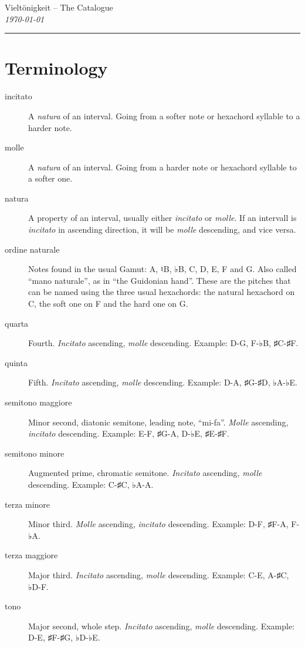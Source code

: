 \documentclass[a4paper,DIV=17,11pt,headings=standardclasses]{scrartcl}
\begin{document}
\hspace{1cm}
\vspace{2cm}

\thispagestyle{empty}
\begin{center}
  {\huge Vieltönigkeit -- The Catalogue}\\[1ex]
  \textit{\today}
\end{center}

\vfill

\hrule

\tableofcontents

\newpage

\section{Terminology}
\begin{description}
\item[incitato] A \textit{natura} of an interval. Going from a softer note or hexachord syllable to a harder note.
\item[molle] A \textit{natura} of an interval. Going from a harder note or hexachord syllable to a softer one.
\item[natura] A property of an interval, usually either \textit{incitato} or \textit{molle}. If an intervall is \textit{incitato} in ascending direction, it will be \textit{molle} descending, and vice versa.
\item[ordine naturale] Notes found in the usual Gamut: A, ♮B, ♭B, C, D, E, F and G. Also called \enquote{mano naturale}, as in \enquote{the Guidonian hand}. These are the pitches that can be named using the three usual hexachords: the natural hexachord on C, the soft one on F and the hard one on G.
\item[quarta] Fourth. \textit{Incitato} ascending, \textit{molle} descending. Example: D-G, F-♭B, ♯C-♯F.
\item[quinta] Fifth. \textit{Incitato} ascending, \textit{molle} descending. Example: D-A, ♯G-♯D, ♭A-♭E.
\item[semitono maggiore] Minor second, diatonic semitone, leading note, \enquote{mi-fa}. \textit{Molle} ascending, \textit{incitato} descending. Example: E-F, ♯G-A, D-♭E, ♯E-♯F.
\item[semitono minore] Augmented prime, chromatic semitone. \textit{Incitato} ascending, \textit{molle} descending. Example: C-♯C, ♭A-A.
\item[terza minore] Minor third. \textit{Molle} ascending, \textit{incitato} descending. Example: D-F, ♯F-A, F-♭A.
\item[terza maggiore] Major third. \textit{Incitato} ascending, \textit{molle} descending. Example: C-E, A-♯C, ♭D-F.
\item[tono] Major second, whole step. \textit{Incitato} ascending, \textit{molle} descending. Example: D-E, ♯F-♯G, ♭D-♭E.
\end{description}
\end{document}
